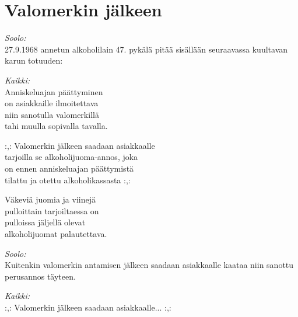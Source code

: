 \section{Valomerkin jälkeen}

\textit{Soolo:}\\
27.9.1968 annetun alkoholilain 47. pykälä pitää sisällään seuraavassa kuultavan karun totuuden:

\textit{Kaikki:}\\
Anniskeluajan päättyminen\\
on asiakkaille ilmoitettava\\
niin sanotulla valomerkillä\\
tahi muulla sopivalla tavalla.

:,: Valomerkin jälkeen saadaan asiakkaalle\\
tarjoilla se alkoholijuoma-annos, joka\\
on ennen anniskeluajan päättymistä\\
tilattu ja otettu alkoholikassasta :,:

Väkeviä juomia ja viinejä\\
pulloittain tarjoiltaessa on\\
pulloissa jäljellä olevat\\
alkoholijuomat palautettava.

\textit{Soolo:}\\
Kuitenkin valomerkin antamisen jälkeen saadaan asiakkaalle
kaataa niin sanottu perusannos täyteen.

\textit{Kaikki:}\\
:,: Valomerkin jälkeen saadaan asiakkaalle... :,:
